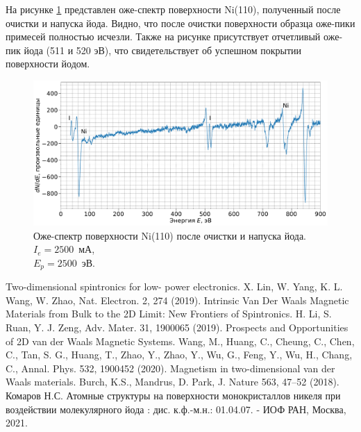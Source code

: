 \documentclass[a4paper,12pt]{article}
\theoremstyle{plain} %
\theoremstyle{definition} %
\theoremstyle{remark} %
\begin{document}
 На рисунке \ref{fig:1_final} представлен оже-спектр поверхности Ni(110), полученный после очистки и напуска йода.  Видно, что после очистки поверхности 
 образца оже-пики примесей полностью исчезли. Также на рисунке присутствует   отчетливый оже-пик йода (511 и 520 эВ), что свидетельствует об успешном покрытии поверхности йодом.

\begin{figure}[H]
	\centering
	\includegraphics[width=0.9\linewidth]{Final}
	\caption{Оже-спектр поверхности Ni(110) после очистки и напуска йода. $I_e = 2500$~мА,\\$E_p = 2500$~эВ.}
	\label{fig:1_final}
\end{figure}






\begin{thebibliography}{2}
	 Two-dimensional spintronics for low- power electronics. X. Lin, W. Yang, K. L. Wang, W. Zhao, Nat. Electron. 2, 274 (2019).
     Intrinsic Van Der Waals Magnetic Materials from Bulk to the 2D Limit: New Frontiers of Spintronics. H. Li, S. Ruan, Y. J. Zeng,  Adv. Mater. 31, 1900065 (2019).
     Prospects and Opportunities of 2D van der Waals Magnetic Systems. Wang, M., Huang, C., Cheung, C., Chen, C., Tan, S. G., Huang, T., Zhao, Y., Zhao, Y., Wu, G., Feng, Y., Wu, H., Chang, C., Annal. Phys. 532, 1900452 (2020).
    Magnetism in two-dimensional van der Waals materials. Burch, K.S., Mandrus, D.  Park, J. Nature 563, 47–52 (2018).
	 Комаров Н.С. Атомные структуры на поверхности монокристаллов никеля при воздействии молекулярного йода
	: дис. к.ф.-м.н.:  01.04.07. - ИОФ РАН, Москва, 2021.
\end{thebibliography}
\end{document}
